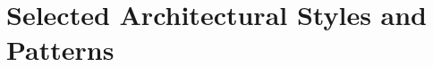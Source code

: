 \documentclass[../../DD.tex]{subfiles}
\begin{document}
\section{Selected Architectural Styles and Patterns\label{sect:2.6}}







\newpage
\end{document}

